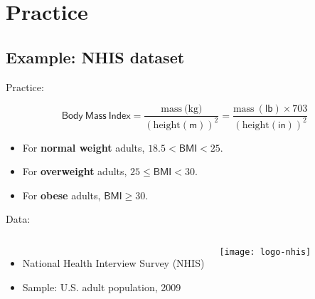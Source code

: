 \documentclass[t]{beamer}
\begin{document}
	\section{Practice}

	\subsection{Example: NHIS dataset}
	
	\begin{frame}[t]{Practice: }

		$$\mathsf{Body~Mass~Index} = \frac{\mbox{mass} \ \mbox{(kg)}}{\left( \mbox{height}(\mathsf{m})\right)^2} = \frac{\mbox{mass} \ \mathsf{(lb)} \times 703}{\left(\mbox{height} (\mathsf{in})\right)^2}$$
		
		\vspace{1em}

		\begin{itemize}
			\item For \textbf{normal weight} adults, $18.5 < \mathsf{BMI} < 25$.
			\item For \textbf{overweight} adults, $25 \leq \mathsf{BMI} < 30$.
			\item For \textbf{obese }adults, $\mathsf{BMI} \geq 30$.		
		\end{itemize}

		\vspace{1em}
		
    Data:
	
			\begin{columns}[c]
				
				\begin{itemize}
					\item National Health Interview Survey (NHIS)
					\item Sample: U.S. adult population, 2009
				\end{itemize}
	
				\texttt{[image: logo-nhis]}
			\end{columns}
	
	\end{frame}
	
\end{document}
